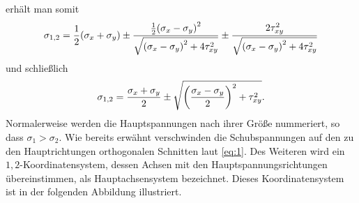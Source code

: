 \documentclass{lecture}
\begin{document}
    erhält man somit
    \[
        \sigma_{1, 2} = \frac{1}{2}\parentheses*{\sigma_x + \sigma_y} \pm \frac{\frac{1}{2}\parentheses*{\sigma_x - \sigma_y}^2}{\sqrt{\parentheses*{\sigma_x - \sigma_y}^2 + 4\tau_{xy}^2}} \pm \frac{2\tau_{xy}^2}{\sqrt{\parentheses*{\sigma_x - \sigma_y}^2 + 4\tau_{xy}^2}}
    \]
    und schließlich
    \begin{equation}\label{eq:3}
        \sigma_{1, 2} = \frac{\sigma_x + \sigma_y}{2} \pm \sqrt{\parentheses*{\frac{\sigma_x - \sigma_y}{2}}^2 + \tau_{xy}^2}.
    \end{equation}
    Normalerweise werden die Hauptspannungen nach ihrer Größe nummeriert, so dass \(\sigma_1 > \sigma_2\).
    Wie bereits erwähnt verschwinden die Schubspannungen auf den zu den Hauptrichtungen orthogonalen Schnitten laut \eqref{eq:1}.
    Des Weiteren wird ein \(1, 2\)-Koordinatensystem, dessen Achsen mit den Hauptspannungsrichtungen übereinstimmen, als Hauptachsensystem bezeichnet.
    Dieses Koordinatensystem ist in der folgenden Abbildung illustriert.
\end{document}
